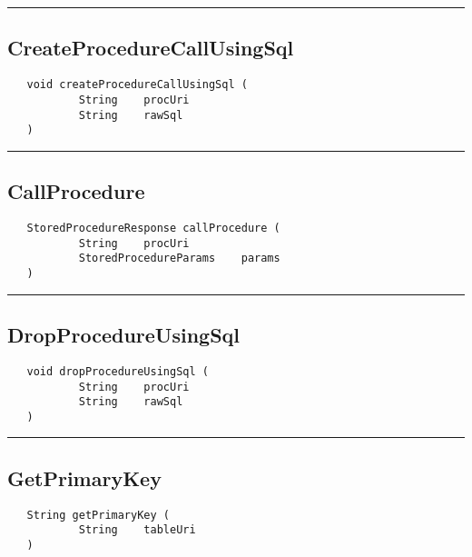 \rule{15cm}{2pt}
\subsection{CreateProcedureCallUsingSql}
\label{Api:CreateProcedureCallUsingSql}
\begin{verbatim}
   void createProcedureCallUsingSql (
           String    procUri
           String    rawSql
   )
\end{verbatim}



\rule{15cm}{2pt}
\subsection{CallProcedure}
\label{Api:CallProcedure}
\begin{verbatim}
   StoredProcedureResponse callProcedure (
           String    procUri
           StoredProcedureParams    params
   )
\end{verbatim}



\rule{15cm}{2pt}
\subsection{DropProcedureUsingSql}
\label{Api:DropProcedureUsingSql}
\begin{verbatim}
   void dropProcedureUsingSql (
           String    procUri
           String    rawSql
   )
\end{verbatim}



\rule{15cm}{2pt}
\subsection{GetPrimaryKey}
\label{Api:GetPrimaryKey}
\begin{verbatim}
   String getPrimaryKey (
           String    tableUri
   )
\end{verbatim}



